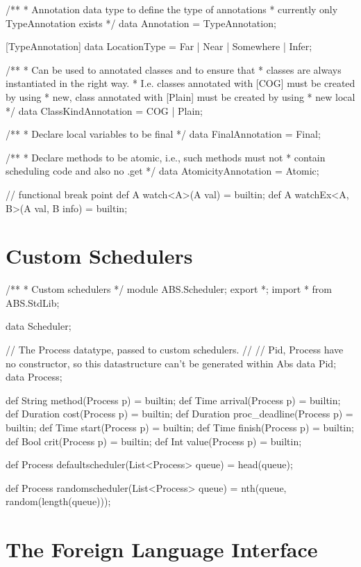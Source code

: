 \begin{abscode}
/**
 * Annotation data type to define the type of annotations
 * currently only TypeAnnotation exists
 */
data Annotation = TypeAnnotation; 
 
[TypeAnnotation]
data LocationType = Far | Near | Somewhere | Infer;
 
/**
 * Can be used to annotated classes and to ensure that
 * classes are always instantiated in the right way.
 * I.e. classes annotated with [COG] must be created by using
 * new, class annotated with [Plain] must be created by using
 * new local
 */
data ClassKindAnnotation = COG | Plain;

/**
 * Declare local variables to be final
 */
data FinalAnnotation = Final;

/**
 * Declare methods to be atomic, i.e., such methods must not
 * contain scheduling code and also no .get
 */ 
data AtomicityAnnotation = Atomic;

// functional break point
def A watch<A>(A val) = builtin;
def A watchEx<A, B>(A val, B info) = builtin;
\end{abscode}

\section{Custom Schedulers}

\begin{abscode}
/**
 * Custom schedulers
 */
module ABS.Scheduler;
export *;
import * from ABS.StdLib;

data Scheduler;

// The Process datatype, passed to custom schedulers.
// 
// Pid, Process have no constructor, so this datastructure can't be generated within Abs
data Pid;
data Process;

def String method(Process p) = builtin;
def Time arrival(Process p) = builtin;
def Duration cost(Process p) = builtin;
def Duration proc_deadline(Process p) = builtin;
def Time start(Process p) = builtin;
def Time finish(Process p) = builtin;
def Bool crit(Process p) = builtin;
def Int value(Process p) = builtin;

def Process defaultscheduler(List<Process> queue) = head(queue);

def Process randomscheduler(List<Process> queue) = nth(queue, random(length(queue)));
\end{abscode}

\section{The Foreign Language Interface}

